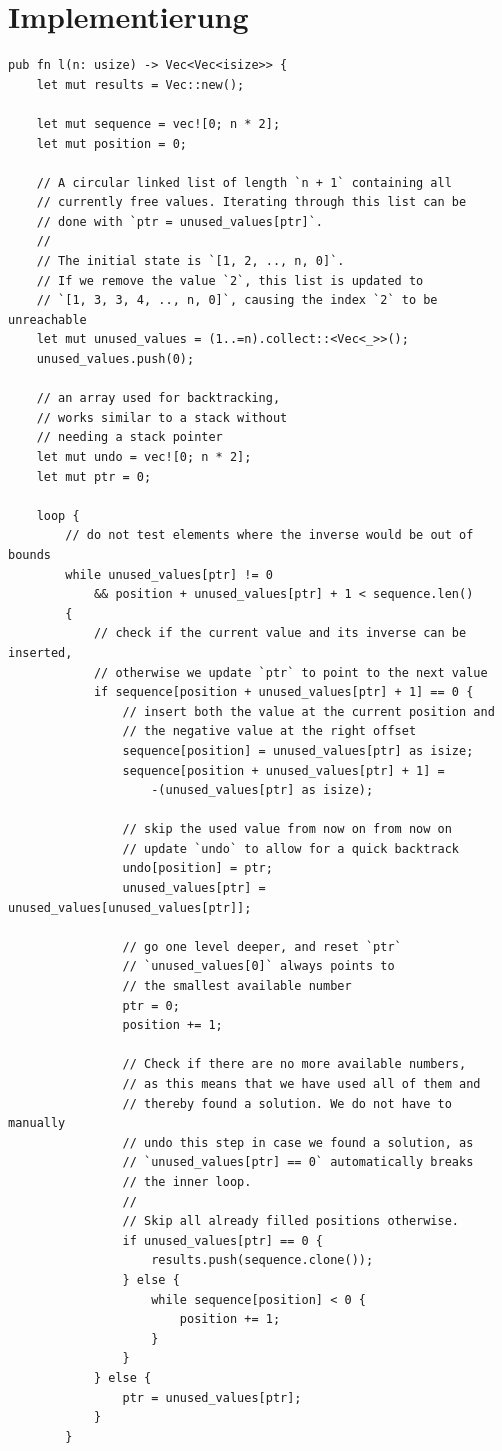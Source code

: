 \section{Implementierung}
\begin{verbatim}
pub fn l(n: usize) -> Vec<Vec<isize>> {
    let mut results = Vec::new();

    let mut sequence = vec![0; n * 2];
    let mut position = 0;

    // A circular linked list of length `n + 1` containing all
    // currently free values. Iterating through this list can be
    // done with `ptr = unused_values[ptr]`.
    //
    // The initial state is `[1, 2, .., n, 0]`.
    // If we remove the value `2`, this list is updated to
    // `[1, 3, 3, 4, .., n, 0]`, causing the index `2` to be unreachable
    let mut unused_values = (1..=n).collect::<Vec<_>>();
    unused_values.push(0);

    // an array used for backtracking,
    // works similar to a stack without
    // needing a stack pointer
    let mut undo = vec![0; n * 2];
    let mut ptr = 0;

    loop {
        // do not test elements where the inverse would be out of bounds
        while unused_values[ptr] != 0
            && position + unused_values[ptr] + 1 < sequence.len()
        {
            // check if the current value and its inverse can be inserted,
            // otherwise we update `ptr` to point to the next value 
            if sequence[position + unused_values[ptr] + 1] == 0 {
                // insert both the value at the current position and
                // the negative value at the right offset
                sequence[position] = unused_values[ptr] as isize;
                sequence[position + unused_values[ptr] + 1] =
                    -(unused_values[ptr] as isize);

                // skip the used value from now on from now on
                // update `undo` to allow for a quick backtrack
                undo[position] = ptr;
                unused_values[ptr] = unused_values[unused_values[ptr]];

                // go one level deeper, and reset `ptr`
                // `unused_values[0]` always points to 
                // the smallest available number
                ptr = 0;
                position += 1;

                // Check if there are no more available numbers,
                // as this means that we have used all of them and
                // thereby found a solution. We do not have to manually
                // undo this step in case we found a solution, as
                // `unused_values[ptr] == 0` automatically breaks 
                // the inner loop.
                //
                // Skip all already filled positions otherwise.
                if unused_values[ptr] == 0 {
                    results.push(sequence.clone());
                } else {
                    while sequence[position] < 0 {
                        position += 1;
                    }
                }
            } else {
                ptr = unused_values[ptr];
            }
        }


\end{verbatim}
